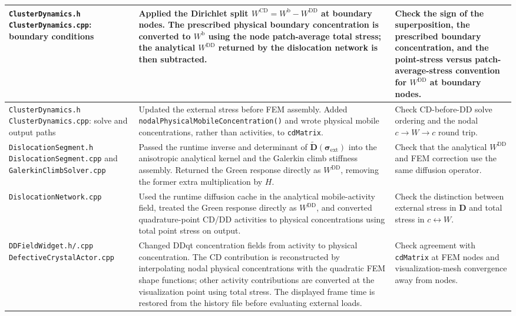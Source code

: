 \documentclass[10pt]{article}
\begin{document}
{\begin{longtable}{|>{\raggedright\arraybackslash}p{}|>{\raggedright\arraybackslash}p{}|>{\raggedright\arraybackslash}p{}|}
\texttt{ClusterDynamics.h}\newline
\texttt{ClusterDynamics.cpp}: boundary conditions
&
Applied the Dirichlet split
$W^{\mathrm{CD}}=W^{\mathrm b}-W^{\mathrm{DD}}$ at boundary nodes.  The
prescribed physical boundary concentration is converted to $W^{\mathrm b}$
using the node patch-average total stress; the analytical
$W^{\mathrm{DD}}$ returned by the dislocation network is then subtracted.
&
Check the sign of the superposition, the prescribed boundary concentration,
and the point-stress versus patch-average-stress convention for
$W^{\mathrm{DD}}$ at boundary nodes.
\\
\hline

\texttt{ClusterDynamics.h}\newline
\texttt{ClusterDynamics.cpp}: solve and output paths
&
Updated the external stress before FEM assembly.  Added
\texttt{nodalPhysicalMobileConcentration()} and wrote physical mobile
concentrations, rather than activities, to \texttt{cdMatrix}.
&
Check CD-before-DD solve ordering and the nodal
$c\rightarrow W\rightarrow c$ round trip.
\\
\hline

\texttt{DislocationSegment.h}\newline
\texttt{DislocationSegment.cpp} and
\texttt{GalerkinClimbSolver.cpp}
&
Passed the runtime inverse and determinant of
$\widetilde{\bm D}(\bm\sigma_{\mathrm{ext}})$ into the anisotropic analytical
kernel and the Galerkin climb stiffness assembly.  Returned the Green response
directly as $W^{\mathrm{DD}}$, removing the former extra multiplication by
$H$.
&
Check that the analytical $W^{\mathrm{DD}}$ and FEM correction use the same
diffusion operator.
\\
\hline

\texttt{DislocationNetwork.cpp}
&
Used the runtime diffusion cache in the analytical mobile-activity field,
treated the Green response directly as $W^{\mathrm{DD}}$, and converted
quadrature-point CD/DD activities to physical concentrations using total
point stress on output.
&
Check the distinction between external stress in $\bm D$ and total stress in
$c\leftrightarrow W$.
\\
\hline

\texttt{DDFieldWidget.h/.cpp}\newline
\texttt{DefectiveCrystalActor.cpp}
&
Changed DDqt concentration fields from activity to physical concentration.
The CD contribution is reconstructed by interpolating nodal physical
concentrations with the quadratic FEM shape functions; other activity
contributions are converted at the visualization point using total stress.
The displayed frame time is restored from the history file before evaluating
external loads.
&
Check agreement with \texttt{cdMatrix} at FEM nodes and visualization-mesh
convergence away from nodes.
\\

\end{longtable}
}
\end{document}
